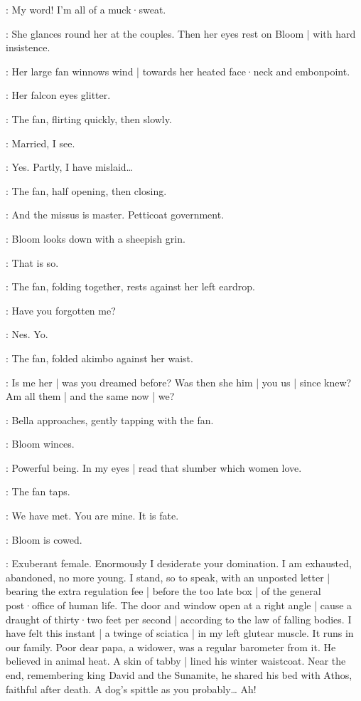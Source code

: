 \Bella:
My word!
%
I'm all of a muck·sweat.

:
She glances round her at the couples.
Then her eyes rest on Bloom |
with hard insistence.

:
Her large fan winnows wind |
towards her heated face·neck and embonpoint.

:
Her falcon eyes glitter.

:
The fan,
flirting quickly,
then slowly.

\Fan:
Married,
I see.

\Bloom:
Yes.
Partly,
I have mislaid…

:
The fan,
half opening,
then closing.

\Fan:
And the missus is master.
Petticoat government.%

:
Bloom looks down with a sheepish grin.

\Bloom:
That is so.

:
The fan,
folding together,
rests against her left eardrop.

\Fan:
Have you forgotten me?

\Bloom:
Nes.
Yo.

:
The fan,
folded akimbo against her waist.

\Fan:
Is me her |
was you dreamed before?
Was then she him |
you us |
since knew?
Am all them |
and the same now |
we?

:
Bella approaches,
%
gently tapping with the fan.

:
Bloom winces.

\Bloom:
Powerful being.
In my eyes |
read that slumber which women love.

:
The fan taps.

\Fan:
We have met.
You are mine.
It is fate.

:
Bloom is cowed.

\Bloom:
Exuberant female.
Enormously I desiderate your domination.
I am exhausted,
abandoned,
no more young.
I stand,
so to speak,
with an unposted letter |
bearing the extra regulation fee |
before the too late box |
of the general post·office of human life.
%
The door and window open at a right angle |
cause a draught of thirty·two feet per second |
according to the law of falling bodies.
I have felt this instant |
a twinge of sciatica |
in my left glutear muscle.
It runs in our family.
Poor dear papa,
a widower,
was a regular barometer from it.
He believed in animal heat.
A skin of tabby |
lined his winter waistcoat.
Near the end,
remembering king David and the Sunamite,
he shared his bed with Athos,
faithful after death.
A dog's spittle as you probably…
Ah!


